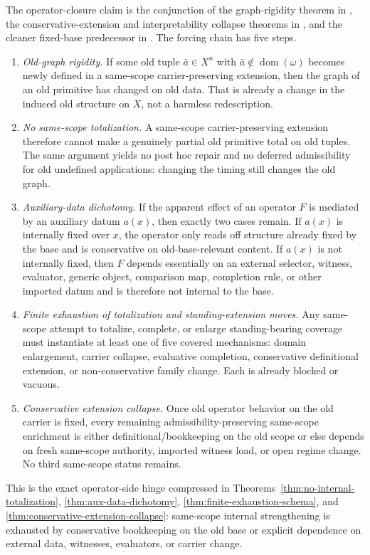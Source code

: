 The operator-closure claim is the conjunction of the graph-rigidity theorem in \sameoperatorsdoc{}, the conservative-extension and interpretability collapse theorems in \clausuradoc{}, and the cleaner fixed-base predecessor in \fixedbasedoc{} \cite{MaleySameScopeOps,MaleyClausura,MaleyFixedBase}. The forcing chain has five steps.
\begin{enumerate}
  \item \emph{Old-graph rigidity.} If some old tuple $\bar a\in X^n$ with $\bar a\notin\operatorname{dom}(\omega)$ becomes newly defined in a same-scope carrier-preserving extension, then the graph of an old primitive has changed on old data. That is already a change in the induced old structure on $X$, not a harmless redescription.
  \item \emph{No same-scope totalization.} A same-scope carrier-preserving extension therefore cannot make a genuinely partial old primitive total on old tuples. The same argument yields no post hoc repair and no deferred admissibility for old undefined applications: changing the timing still changes the old graph.
  \item \emph{Auxiliary-data dichotomy.} If the apparent effect of an operator $F$ is mediated by an auxiliary datum $a(x)$, then exactly two cases remain. If $a(x)$ is internally fixed over $x$, the operator only reads off structure already fixed by the base and is conservative on old-base-relevant content. If $a(x)$ is not internally fixed, then $F$ depends essentially on an external selector, witness, evaluator, generic object, comparison map, completion rule, or other imported datum and is therefore not internal to the base.
  \item \emph{Finite exhaustion of totalization and standing-extension moves.} Any same-scope attempt to totalize, complete, or enlarge standing-bearing coverage must instantiate at least one of five covered mechanisms: domain enlargement, carrier collapse, evaluative completion, conservative definitional extension, or non-conservative family change. Each is already blocked or vacuous.
  \item \emph{Conservative extension collapse.} Once old operator behavior on the old carrier is fixed, every remaining admissibility-preserving same-scope enrichment is either definitional/bookkeeping on the old scope or else depends on fresh same-scope authority, imported witness load, or open regime change. No third same-scope status remains.
\end{enumerate}
This is the exact operator-side hinge compressed in Theorems~\ref{thm:no-internal-totalization}, \ref{thm:aux-data-dichotomy}, \ref{thm:finite-exhaustion-schema}, and \ref{thm:conservative-extension-collapse}: same-scope internal strengthening is exhausted by conservative bookkeeping on the old base or explicit dependence on external data, witnesses, evaluators, or carrier change.


